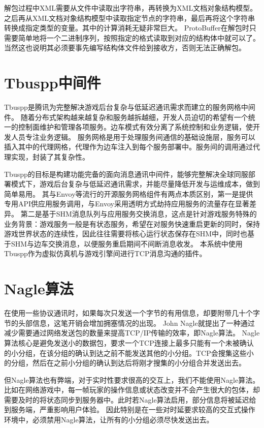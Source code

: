 \par
解包过程中XML需要从文件中读取出字符串，再转换为XML文档对象结构模型。之后再从XML文档对象结构模型中读取指定节点的字符串，最后再将这个字符串转换成指定类型的变量。其中的计算消耗无疑非常巨大。
ProtoBuffer在解包时只需要简单地将一个二进制序列，按照指定的格式读取到对应的结构体中就可以了。当然这也说明其必须要事先编写结构体文件给到接收方，否则无法正确解包。
\section{Tbuspp中间件}
Tbuspp是腾讯为完整解决游戏后台复杂与低延迟通讯需求而建立的服务网格中间件。
随着分布式架构越来越复杂和服务越拆越细，开发人员迫切的希望有一个统一的控制面维护和管理各项服务。边车模式有效分离了系统控制和业务逻辑，使开发人员专注业务逻辑\cite{tbus2}。
服务网格是用于处理服务间通信的基础设施层，服务可以插入其中的代理网格，代理作为边车注入到每个服务部署中\cite{tbus1}。服务间的调用通过代理实现，封装了其复杂性。
\par
Tbuspp的目标是构建功能完备的面向消息通讯中间件，能够完整解决全球同服部署模式下，游戏后台复杂与低延迟通讯需求，并能尽量降低开发与运维成本，做到简单易用。
其与Envoy等流行的开源服务网格组件有两点本质区别，第一是提供专用API供应用服务调用，与Envoy采用透明方式劫持应用服务的流量存在显著差异。
第二是基于SHM消息队列与应用服务交换消息，这点是针对游戏服务特殊的业务背景：游戏服务一般是有状态服务，希望在对服务快速重启更新的同时，保持游戏世界状态的连续性，因此往往需要将核心运行状态保存在SHM中，同时也基于SHM与边车交换消息，以便服务重启期间不间断消息收发。
本系统中使用Tbuspp作为虚拟仿真机与游戏引擎间进行TCP消息沟通的插件。
\section{Nagle算法}
在使用一些协议通讯时，如果每次只发送一个字节的有用信息，却要附带几十个字节的头部信息，这笔开销会增加拥塞情况的出现。
John Nagle就提出了一种通过减少需要通过网络发送包的数量来提高TCP/IP传输的效率\cite{nagle2}，即Nagle算法。
Nagle算法核心是避免发送小的数据包，要求一个TCP连接上最多只能有一个未被确认的小分组，在该分组的确认到达之前不能发送其他的小分组。TCP会搜集这些小的分组，然后在之前小分组的确认到达后将刚才搜集的小分组合并发送出去。
\par
但Nagle算法也有弊端，对于实时性要求很高的交互上，我们不能使用Nagle算法\cite{nagle1}。
比如在网络游戏中，每一帧玩家的操作信息或状态改变并不会产生很大的包体，却需要及时的将状态同步到服务器中。此时若Nagle算法启用，部分信息将被延迟给到服务端，严重影响用户体验。
因此特别是在一些对时延要求较高的交互式操作环境中，必须禁用Nagle算法，让所有的小分组必须尽快发送出去。

